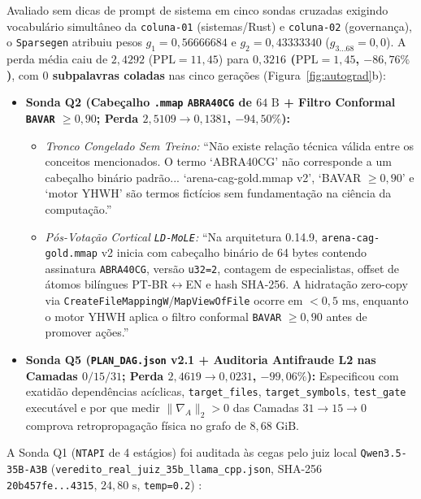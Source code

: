 \documentclass[10pt,a4paper]{article}
\begin{document}
Avaliado sem dicas de prompt de sistema em cinco sondas cruzadas exigindo vocabul\'ario simult\^aneo da \texttt{coluna-01} (sistemas/Rust) e \texttt{coluna-02} (governan\c{c}a), o \texttt{Sparsegen} atribuiu pesos $g_1 = 0,56666684$ e $g_2 = 0,43333340$ ($g_{3\dots 68} = 0,0$). A perda m\'edia caiu de $2,4292$ ($\text{PPL}=11,45$) para \textbf{$0,3216$ ($\text{PPL}=1,45$, $-86,76\%$)}, com \textbf{$0$ subpalavras coladas} nas cinco gera\c{c}\~oes (Figura~\ref{fig:autograd}b):
\begin{itemize}
  \item \textbf{Sonda Q2 (Cabe\c{c}alho \texttt{.mmap} \texttt{ABRA40CG} de $64\text{ B}$ + Filtro Conformal \texttt{BAVAR} $\ge 0,90$; Perda $2,5109 \to 0,1381$, $-94,50\%$):}
    \begin{itemize}
      \item \textit{Tronco Congelado Sem Treino:} ``N\~ao existe rela\c{c}\~ao t\'ecnica v\'alida entre os conceitos mencionados. O termo `ABRA40CG' n\~ao corresponde a um cabe\c{c}alho bin\'ario padr\~ao... `arena-cag-gold.mmap v2', `BAVAR $\ge 0,90$' e `motor YHWH' s\~ao termos fict\'icios sem fundamenta\c{c}\~ao na ci\^encia da computa\c{c}\~ao.''
      \item \textit{P\'os-Vota\c{c}\~ao Cortical \texttt{LD-MoLE}:} ``Na arquitetura 0.14.9, \texttt{arena-cag-\allowbreak{}gold.mmap} v2 inicia com cabe\c{c}alho bin\'ario de 64 bytes contendo assinatura \texttt{ABRA40CG}, vers\~ao \texttt{u32=2}, contagem de especialistas, offset de \'atomos bil\'ingues PT-BR$\leftrightarrow$EN e hash SHA-256. A hidrata\c{c}\~ao zero-copy via \texttt{CreateFile\allowbreak{}MappingW}/\allowbreak{}\texttt{MapViewOfFile} ocorre em $<0,5\text{ ms}$, enquanto o motor YHWH aplica o filtro conformal \texttt{BAVAR} $\ge 0,90$ antes de promover a\c{c}\~oes.''
    \end{itemize}
  \item \textbf{Sonda Q5 (\texttt{PLAN\_\allowbreak{}DAG.json} v2.1 + Auditoria Antifraude L2 nas Camadas $0/15/31$; Perda $2,4619 \to 0,0231$, $-99,06\%$):} Especificou com exatid\~ao depend\^encias ac\'iclicas, \texttt{target\_\allowbreak{}files}, \texttt{target\_\allowbreak{}symbols}, \texttt{test\_\allowbreak{}gate} execut\'avel e por que medir $\|\nabla_A\|_2 > 0$ das Camadas $31 \to 15 \to 0$ comprova retropropaga\c{c}\~ao f\'isica no grafo de $8,68\text{ GiB}$.
\end{itemize}

A Sonda Q1 (\texttt{NTAPI} de 4 est\'agios) foi auditada \`as cegas pelo juiz local \texttt{Qwen3.5-35B-A3B} (\texttt{veredito\_\allowbreak{}real\_\allowbreak{}juiz\_\allowbreak{}35b\_\allowbreak{}llama\_\allowbreak{}cpp.json}, SHA-256 \texttt{20b457fe...4315}, $24,80\text{ s}$, \texttt{temp=0.2}) \cite{zheng2023judging}:
\end{document}
